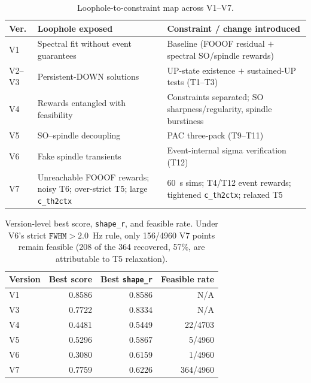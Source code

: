 \documentclass[conference]{IEEEtran}
\newcommand{\code}[1]{\texttt{#1}}
\begin{document}
\begin{table}[!t]
\caption{Loophole-to-constraint map across V1--V7.}
\label{tab:loophole}
\centering
\footnotesize
\begin{tabular}{@{}p{0.55cm} p{3.2cm} p{3.3cm}@{}}
\toprule
Ver. & Loophole exposed & Constraint / change introduced \\
\midrule
V1 & Spectral fit without event guarantees & Baseline (FOOOF residual $+$ spectral SO/spindle rewards) \\
V2--V3 & Persistent-DOWN solutions & UP-state existence $+$ sustained-UP tests (T1--T3) \\
V4 & Rewards entangled with feasibility & Constraints separated; SO sharpness/regularity, spindle burstiness \\
V5 & SO--spindle decoupling & PAC three-pack (T9--T11) \\
V6 & Fake spindle transients & Event-internal sigma verification (T12) \\
V7 & Unreachable FOOOF rewards; noisy T6; over-strict T5; large \code{c\_th2ctx} & 60~s sims; T4/T12 event rewards; tightened \code{c\_th2ctx}; relaxed T5 \\
\bottomrule
\end{tabular}
\end{table}

\begin{table}[!t]
\caption{Version-level best score, \code{shape\_r}, and feasible rate. Under
V6's strict $\code{FWHM}>2.0$~Hz rule, only 156/4960 V7 points remain feasible
(208 of the 364 recovered, 57\%, are attributable to T5 relaxation).}
\label{tab:feasibility}
\centering
\footnotesize
\begin{tabular}{@{}l r r r@{}}
\toprule
Version & Best score & Best \code{shape\_r} & Feasible rate \\
\midrule
V1 & 0.8586 & 0.8586 & N/A \\
V3 & 0.7722 & 0.8334 & N/A \\
V4 & 0.4481 & 0.5449 & 22/4703 \\
V5 & 0.5296 & 0.5867 & 5/4960 \\
V6 & 0.3080 & 0.6159 & 1/4960 \\
V7 & 0.7759 & 0.6226 & 364/4960 \\
\bottomrule
\end{tabular}
\end{table}
\end{document}
